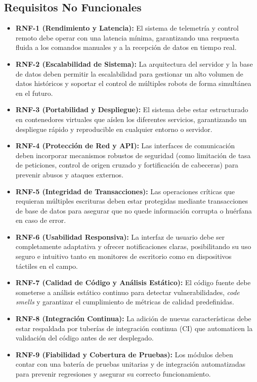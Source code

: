 \subsection{Requisitos No Funcionales}
\begin{itemize}
    \item \textbf{RNF-1 (Rendimiento y Latencia):} El sistema de telemetría y control remoto debe operar con una latencia mínima, garantizando una respuesta fluida a los comandos manuales y a la recepción de datos en tiempo real.
    \item \textbf{RNF-2 (Escalabilidad de Sistema):} La arquitectura del servidor y la base de datos deben permitir la escalabilidad para gestionar un alto volumen de datos históricos y soportar el control de múltiples robots de forma simultánea en el futuro.
    \item \textbf{RNF-3 (Portabilidad y Despliegue):} El sistema debe estar estructurado en contenedores virtuales que aíslen los diferentes servicios, garantizando un despliegue rápido y reproducible en cualquier entorno o servidor.
    \item \textbf{RNF-4 (Protección de Red y API):} Las interfaces de comunicación deben incorporar mecanismos robustos de seguridad (como limitación de tasa de peticiones, control de origen cruzado y fortificación de cabeceras) para prevenir abusos y ataques externos.
    \item \textbf{RNF-5 (Integridad de Transacciones):} Las operaciones críticas que requieran múltiples escrituras deben estar protegidas mediante transacciones de base de datos para asegurar que no quede información corrupta o huérfana en caso de error.
    \item \textbf{RNF-6 (Usabilidad Responsiva):} La interfaz de usuario debe ser completamente adaptativa y ofrecer notificaciones claras, posibilitando su uso seguro e intuitivo tanto en monitores de escritorio como en dispositivos táctiles en el campo.
    \item \textbf{RNF-7 (Calidad de Código y Análisis Estático):} El código fuente debe someterse a análisis estático continuo para detectar vulnerabilidades, \textit{code smells} y garantizar el cumplimiento de métricas de calidad predefinidas.
    \item \textbf{RNF-8 (Integración Continua):} La adición de nuevas características debe estar respaldada por tuberías de integración continua (CI) que automaticen la validación del código antes de ser desplegado.
    \item \textbf{RNF-9 (Fiabilidad y Cobertura de Pruebas):} Los módulos deben contar con una batería de pruebas unitarias y de integración automatizadas para prevenir regresiones y asegurar su correcto funcionamiento.

\end{itemize}
